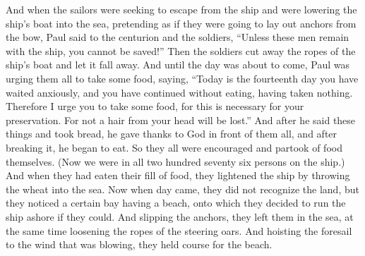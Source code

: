 \begin{biblechapter}
\verse And when the sailors were seeking to escape from the ship and were lowering the ship’s boat into the sea, pretending as if they were going to lay out anchors from the bow,
\verse Paul said to the centurion and the soldiers, “Unless these men remain with the ship, you cannot be saved!”
\verse Then the soldiers cut away the ropes of the ship’s boat and let it fall away.
\verse And until the day was about to come, Paul was urging them all to take some food, saying, “Today is the fourteenth day you have waited anxiously, and you have continued without eating, having taken nothing.
\verse Therefore I urge you to take some food, for this is necessary for your preservation. For not a hair from your head will be lost.”
\verse And after he said these things and took bread, he gave thanks to God in front of them all, and after breaking it, he began to eat.
\verse So they all were encouraged and partook of food themselves.
\verse (Now we were in all two hundred seventy six persons on the ship.)
\verse And when they had eaten their fill of food, they lightened the ship by throwing the wheat into the sea.
 Now when day came, they did not recognize the land, but they noticed a certain bay having a beach, onto which they decided to run the ship ashore if they could.
\verse And slipping the anchors, they left them in the sea, at the same time loosening the ropes of the steering oars. And hoisting the foresail to the wind that was blowing, they held course for the beach.

\end{biblechapter}
